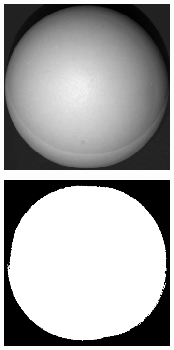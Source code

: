 \documentclass[11pt]{article}
\begin{document}
\begin{figure}[!hbt]
  
    \begin{subfigure}[h]{0.3\textwidth}
    \centering
    \includegraphics[width = \textwidth]{../sphere-images/real4.jpg}
  \end{subfigure} 
   \begin{subfigure}[h]{0.3\textwidth}
    \centering
    \includegraphics[width = \textwidth]{../sphere-images/mask.png}
  \end{subfigure} 
  

\end{figure}
\end{document}
